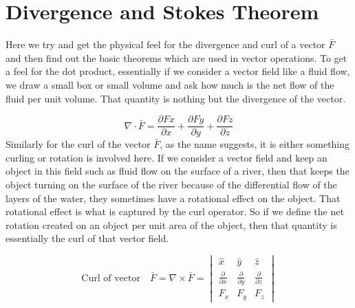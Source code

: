 \chapter{Divergence and Stokes Theorem}\label{lec:lec17}
Here we try and get the physical feel for the divergence and curl of a vector $\bar{F}$  and then find out the basic theorems which are used in vector operations.
To get a feel for the dot product, essentially if we consider a vector field like a fluid flow, we draw a small box or small volume and ask how much is the net flow of the fluid per unit volume. That quantity is nothing but the divergence of the vector.

\begin{equation}
\nabla\cdot \bar{F} = \frac{\partial Fx}{\partial x} + \frac{\partial Fy}{\partial y} + \frac{\partial Fz}{\partial z}	
\end{equation}
Similarly for the curl of the vector $\bar{F}$, as the name suggests, it is either something curling or rotation is involved here. If we consider a vector field and keep an object in this field such as fluid flow on the surface of a river, then that keeps the object turning on the surface of the river because of the differential flow of the layers of the water, they sometimes have a rotational effect on the object. That rotational effect is what is captured by the curl operator. So if we define the net rotation created on an object per unit area of the object, then that quantity is essentially the curl of that vector field.

\begin{dmath*}
\text{Curl of vector} \quad \bar{F} = \nabla \times \bar{F} = 
\begin{vmatrix}
\hat{x} & \hat{y} & \hat{z}\\
\frac{\partial}{\partial x} & \frac{\partial}{\partial y} & \frac{\partial}{\partial z}\\
F_{x} & F_{y} & F_{z}
\end{vmatrix}
\end{dmath*}

